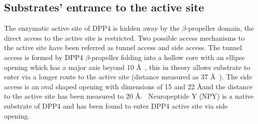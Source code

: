 \subsection{Substrates' entrance to the active site}

The enzymatic active site of DPP4 is hidden away by the $\beta$-propeller domain, the direct access to the active site is restricted. Two possible access mechanisms to the active site have been referred as tunnel access and side access. The tunnel access is formed by DPP4 $\beta$-propeller  folding into a hollow core with an ellipse opening which has a major axis beyond 10 \AA~\cite{Hiramatsu2003}, this in theory allows substrate to enter via a longer route to the active site (distance measured as 37 \AA~\cite{Engel_2003}). The side access is an oval shaped opening with dimensions of 15 and 22 \AA and the distance to the active site has been measured to 20 \AA.~\cite{Engel_2003, Rasmussen_2002,Weihofen_2004} Neuropeptide Y (NPY) is a native substrate of DPP4 and has been found to enter DPP4 active site via side opening. ~\cite{Aertgeerts_2004}